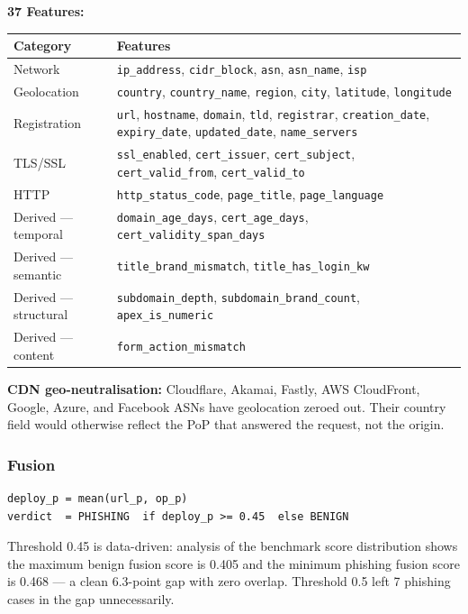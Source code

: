 \documentclass[11pt,a4paper]{article}
\newcommand{\code}[1]{\texttt{#1}}
\begin{document}
\medskip
\textbf{37 Features:}

\begin{table}[h]
\centering
\small
\begin{tabularx}{\textwidth}{lX}
\toprule
Category & Features \\
\midrule
Network &
  \code{ip\_address}, \code{cidr\_block}, \code{asn},
  \code{asn\_name}, \code{isp} \\
Geolocation &
  \code{country}, \code{country\_name}, \code{region},
  \code{city}, \code{latitude}, \code{longitude} \\
Registration &
  \code{url}, \code{hostname}, \code{domain}, \code{tld},
  \code{registrar}, \code{creation\_date}, \code{expiry\_date},
  \code{updated\_date}, \code{name\_servers} \\
TLS/SSL &
  \code{ssl\_enabled}, \code{cert\_issuer}, \code{cert\_subject},
  \code{cert\_valid\_from}, \code{cert\_valid\_to} \\
HTTP &
  \code{http\_status\_code}, \code{page\_title},
  \code{page\_language} \\
Derived --- temporal &
  \code{domain\_age\_days}, \code{cert\_age\_days},
  \code{cert\_validity\_span\_days} \\
Derived --- semantic &
  \code{title\_brand\_mismatch}, \code{title\_has\_login\_kw} \\
Derived --- structural &
  \code{subdomain\_depth}, \code{subdomain\_brand\_count},
  \code{apex\_is\_numeric} \\
Derived --- content &
  \code{form\_action\_mismatch} \\
\bottomrule
\end{tabularx}
\end{table}

\textbf{CDN geo-neutralisation:} Cloudflare, Akamai, Fastly, AWS
CloudFront, Google, Azure, and Facebook ASNs have geolocation zeroed
out. Their country field would otherwise reflect the PoP that answered
the request, not the origin.

\subsubsection*{Fusion}

\begin{lstlisting}
deploy_p = mean(url_p, op_p)
verdict  = PHISHING  if deploy_p >= 0.45  else BENIGN
\end{lstlisting}

Threshold 0.45 is data-driven: analysis of the benchmark score
distribution shows the maximum benign fusion score is 0.405 and the
minimum phishing fusion score is 0.468 --- a clean 6.3-point gap with
zero overlap. Threshold 0.5 left 7 phishing cases in the gap
unnecessarily.
\end{document}
